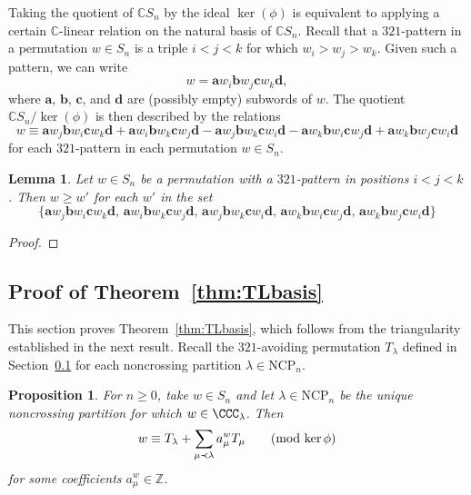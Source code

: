 \documentclass[12pt]{article}
\newtheorem{prop}[equation]{Proposition}
\newtheorem{lem}[equation]{Lemma}
\theoremstyle{definition}
\theoremstyle{remark}
\numberwithin{equation}{section}
\newcommand{\CC}{\mathbb{C}}
\newcommand{\ZZ}{\mathbb{Z}}
\newcommand{\NCP}{\mathrm{NCP}}
\begin{document}
Taking the quotient of $\CC S_{n}$ by the ideal $\ker(\phi)$ is equivalent to applying a certain $\CC$-linear relation on the natural basis of $\CC S_{n}$.  Recall that a $321$-pattern in a permutation $w \in S_{n}$ is a triple $i < j < k$ for which $w_{i} > w_{j} > w_{k}$.  Given such a pattern, we can write
\[
w = \mathbf{a}w_{i}\mathbf{b}w_{j}\mathbf{c}w_{k}\mathbf{d},
\]
where $\mathbf{a}$, $\mathbf{b}$, $\mathbf{c}$, and $\mathbf{d}$ are (possibly empty) subwords of $w$.  The quotient $\CC S_{n} / \ker(\phi)$ is then described by the relations
\begin{equation}
\label{eq:321relation}
w \equiv \mathbf{a}w_{j}\mathbf{b}w_{i}\mathbf{c}w_{k}\mathbf{d} + \mathbf{a}w_{i}\mathbf{b}w_{k}\mathbf{c}w_{j}\mathbf{d} - \mathbf{a}w_{j}\mathbf{b}w_{k}\mathbf{c}w_{i}\mathbf{d} - \mathbf{a}w_{k}\mathbf{b}w_{i}\mathbf{c}w_{j}\mathbf{d} + \mathbf{a}w_{k}\mathbf{b}w_{j}\mathbf{c}w_{i}\mathbf{d}
\end{equation}
for each $321$-pattern in each permutation $w \in S_{n}$.

\begin{lem}
Let $w \in S_{n}$ be a permutation with a $321$-pattern in positions $i < j < k$.  Then $w \ge w'$ for each $w'$ in the set
\[
\{
\mathbf{a}w_{j}\mathbf{b}w_{i}\mathbf{c}w_{k}\mathbf{d},  \,
\mathbf{a}w_{i}\mathbf{b}w_{k}\mathbf{c}w_{j}\mathbf{d}, \,
\mathbf{a}w_{j}\mathbf{b}w_{k}\mathbf{c}w_{i}\mathbf{d}, \,
\mathbf{a}w_{k}\mathbf{b}w_{i}\mathbf{c}w_{j}\mathbf{d}, \,
\mathbf{a}w_{k}\mathbf{b}w_{j}\mathbf{c}w_{i}\mathbf{d}
\}
\]
\end{lem}
\begin{proof}

\end{proof}


\subsection{Proof of Theorem~\ref{thm:TLbasis}}

This section proves Theorem~\ref{thm:TLbasis}, which follows from the triangularity established in the next result.  Recall the $321$-avoiding permutation $T_{\lambda}$ defined in Section~\ref{} for each noncrossing partition $\lambda \in \NCP_{n}$.

\begin{prop}
\label{prop:TLbasis}
For $n \ge 0$, take $w \in S_{n}$ and let $\lambda \in \NCP_{n}$ be the unique noncrossing partition for which $w \in \CCC_{\lambda}$.  Then
\[
w \equiv T_{\lambda} + \sum_{\mu \prec \lambda} a_{\mu}^{w} T_{\mu} \qquad \text{(mod $ \ker\phi$)}
\]
for some coefficients $a_{\mu}^{w} \in \ZZ$.
\end{prop}
\end{document}

